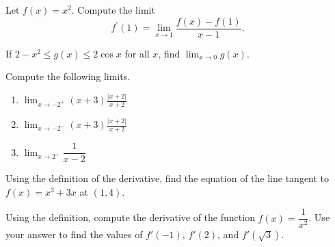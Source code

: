 \documentclass[10pt]{amsart}
\begin{document}
\vspace{1.5in}

\begin{thm}
  Let \(f(x) = x^2\).
  Compute the limit
  \[f^\prime(1) = \lim_{x \to 1}\frac{f(x)-f(1)}{x - 1}.\]
\end{thm}

\vspace{2in}

\begin{thm}
  If \(2-x^2\leq g(x)\leq 2\cos x\) for all \(x\), find \(\lim_{x\rightarrow 0}g(x)\).
\end{thm}

\newpage

\begin{thm}
  Compute the following limits.
  \begin{multicols}{3}
    \begin{enumerate}
    \item
      \(\displaystyle{\lim_{x\rightarrow -2^+}(x+3)\frac{\vert x+2\vert}{x+2}}\)
    \item
      \(\displaystyle{\lim_{x\rightarrow -2^-}(x+3)\frac{\vert x+2\vert}{x+2}}\)
    \item
      \(\displaystyle{\lim_{x\rightarrow 2^+}\dfrac{1}{x-2}}\)
    \end{enumerate}
  \end{multicols}
\end{thm}

\vspace{2in}

\begin{thm}
  Using the definition of the derivative, find the equation of the line tangent to \(f(x)=x^3+3x\) at \((1,4)\).
\end{thm}

\vspace{2in}

\begin{thm}
  Using the definition, compute the derivative of the function \(f(x) = \dfrac{1}{x^2}\).
  Use your answer to find the values of $f'(-1)$, $f'(2)$, and $f'(\sqrt{3})$.
\end{thm}
\end{document}
